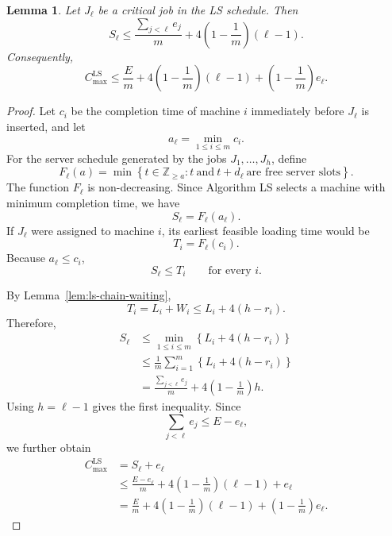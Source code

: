 \documentclass[11pt]{article}
\newtheorem{lemma}[theorem]{Lemma}
\begin{document}
\begin{lemma}
\label{lem:ls-critical-start}
Let \(J_\ell\) be a critical job in the LS schedule. Then
\[
        S_\ell
        \le
        \frac{\sum_{j<\ell}e_j}{m}
        +
        4\left(1-\frac1m\right)(\ell-1).
\]
Consequently,
\[
        C_{\max}^{\mathrm{LS}}
        \le
        \frac{E}{m}
        +
        4\left(1-\frac1m\right)(\ell-1)
        +
        \left(1-\frac1m\right)e_\ell.
\]
\end{lemma}

\begin{proof}
Let \(c_i\) be the completion time of machine \(i\) immediately before
\(J_\ell\) is inserted, and let
\[
        a_\ell=\min_{1\le i\le m}c_i.
\]
For the server schedule generated by the jobs  \(J_1,\ldots,J_h\), define
\[
        F_\ell(a)
        =
        \min\left\{
        t\in\mathbb Z_{\ge a}:
        t\ \text{and}\ t+d_\ell\ \text{are free server slots}
        \right\}.
\]
The function \(F_\ell\) is non-decreasing. Since Algorithm LS selects a machine with
minimum completion time, we have 
\[
        S_\ell=F_\ell(a_\ell).
\]
If \(J_\ell\) were assigned to machine \(i\), its earliest feasible loading
time would be
\[
        T_i=F_\ell(c_i).
\]
Because \(a_\ell\le c_i\),
\[
        S_\ell\le T_i
        \qquad
        \text{for every }i.
\]

By Lemma~\ref{lem:ls-chain-waiting},
\[
        T_i=L_i+W_i\le L_i+4(h-r_i).
\]
Therefore,
\[
\begin{aligned}
        S_\ell
        &\le
        \min_{1\le i\le m}
        \left\{L_i+4(h-r_i)\right\} \\
        &\le
        \frac1m\sum_{i=1}^m
        \left\{L_i+4(h-r_i)\right\} \\
        &=
        \frac{\sum_{j<\ell}e_j}{m}
        +
        4\left(1-\frac1m\right)h.
\end{aligned}
\]
Using \(h=\ell-1\) gives the first inequality. Since
\[
        \sum_{j<\ell}e_j\le E-e_\ell,
\]
we further obtain
\[
\begin{aligned}
        C_{\max}^{\mathrm{LS}}
        &=S_\ell+e_\ell \\
        &\le
        \frac{E-e_\ell}{m}
        +
        4\left(1-\frac1m\right)(\ell-1)
        +e_\ell \\
        &=
        \frac{E}{m}
        +
        4\left(1-\frac1m\right)(\ell-1)
        +
        \left(1-\frac1m\right)e_\ell.
\end{aligned}
\]
\end{proof}
\end{document}
